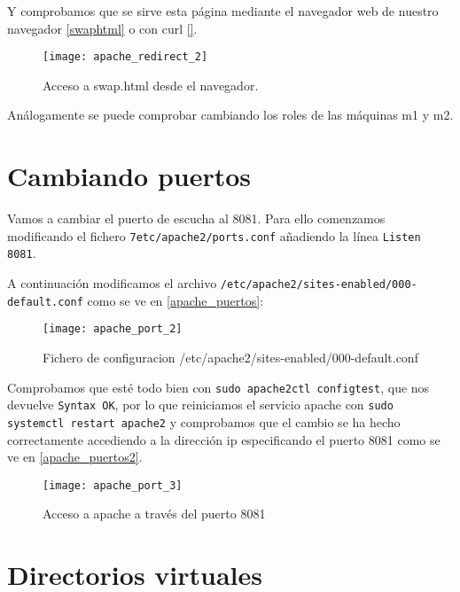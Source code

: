 Y comprobamos que se sirve esta página mediante el navegador web de nuestro navegador \eqref{swaphtml} o con curl \eqref{}.

\begin{figure}[h!]
\begin{center}
\caption{Acceso a swap.html desde el navegador.}
\label{swaphtml}
\texttt{[image: apache\_redirect\_2]}
\end{center}
\end{figure}

Análogamente se puede comprobar cambiando los roles de las máquinas m1 y m2.

\section{Cambiando puertos}

Vamos a cambiar el puerto de escucha al 8081. Para ello comenzamos modificando el fichero \verb|7etc/apache2/ports.conf| añadiendo la línea \verb|Listen 8081|.

A continuación modificamos el archivo \verb|/etc/apache2/sites-enabled/000-default.conf| como se ve en \eqref{apache_puertos}:

\begin{figure}[h!]
\begin{center}
\caption{Fichero de configuracion /etc/apache2/sites-enabled/000-default.conf}
\label{apache_puertos}
\texttt{[image: apache\_port\_2]}
\end{center}
\end{figure}

Comprobamos que esté todo bien con \verb|sudo apache2ctl configtest|, que nos devuelve \verb|Syntax OK|, por lo que reiniciamos el servicio apache con \verb|sudo systemctl restart apache2| y comprobamos que el cambio se ha hecho correctamente accediendo a la dirección ip especificando el puerto 8081 como se ve en \eqref{apache_puertos2}.

\begin{figure}[h!]
\begin{center}
\caption{Acceso a apache a través del puerto 8081}
\label{apache_puertos2}
\texttt{[image: apache\_port\_3]}
\end{center}
\end{figure}

\section{Directorios virtuales}

